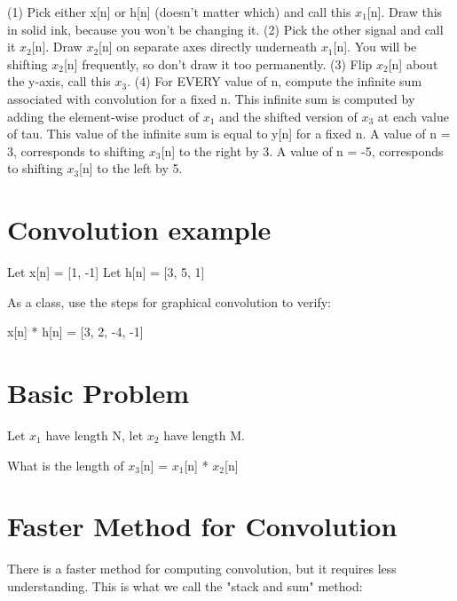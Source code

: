 \documentclass[11pt]{article}
\begin{document}
(1) Pick either x[n] or h[n] (doesn't matter which) and call this $x_1$[n]. Draw this in solid ink, because you won't be changing it.\newline
(2) Pick the other signal and call it $x_2$[n]. Draw $x_2$[n] on separate axes directly underneath $x_1$[n]. You will be shifting $x_2$[n] frequently, so don't draw it too permanently.\newline
(3) Flip $x_2$[n] about the y-axis, call this $x_3$.\newline
(4) For EVERY value of n, compute the infinite sum associated with convolution for a fixed n. This infinite sum is computed by adding the element-wise product of $x_1$ and the shifted version of $x_3$ at each value of tau. This value of the infinite sum is equal to y[n] for a fixed n. A value of n = 3, corresponds to shifting $x_3$[n] to the right by 3.  A value of n = -5, corresponds to shifting $x_3$[n] to the left by 5. 

\section{Convolution example}

Let x[n] = [1, -1]\newline
Let h[n] = [3, 5, 1]

As a class, use the steps for graphical convolution to verify:

\begin{center}

x[n] * h[n] = [3, 2, -4, -1]

\end{center}


\section{Basic Problem}

Let $x_1$ have length N, let $x_2$ have length M. \newline

What is the length of $x_3$[n] = $x_1$[n] * $x_2$[n]


\section{Faster Method for Convolution}

There is a faster method for computing convolution, but it requires less understanding. This is what we call the "stack and sum" method:\newline
\end{document}
